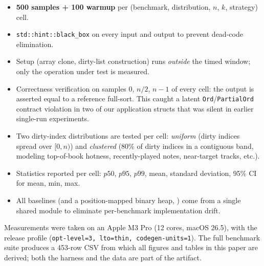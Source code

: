 \begin{itemize}
  \item \textbf{500 samples + 100 warmup} per
        (benchmark, distribution, $n$, $k$, strategy) cell.
  \item \texttt{std::hint::black\_box} on every input and output to
        prevent dead-code elimination.
  \item Setup (array clone, dirty-list construction) runs \emph{outside}
        the timed window; only the operation under test is measured.
  \item Correctness verification on samples $0$, $n/2$, $n-1$ of every cell:
        the output is asserted equal to a reference full-sort. This caught a
        latent \texttt{Ord}/\texttt{PartialOrd} contract violation in two of
        our application structs that was silent in earlier single-run
        experiments.
  \item Two dirty-index distributions are tested per cell: \emph{uniform}
        (dirty indices spread over $[0,n)$) and \emph{clustered} (80\% of
        dirty indices in a contiguous band, modeling top-of-book hotness,
        recently-played notes, near-target tracks, etc.).
  \item Statistics reported per cell: $p50$, $p95$, $p99$, mean, standard
        deviation, 95\% CI for mean, min, max.
  \item All baselines (\ESM and a position-mapped binary heap, \PosHeap)
        come from a single shared module to eliminate
        per-benchmark implementation drift.
\end{itemize}

Measurements were taken on an Apple M3 Pro (12 cores, macOS 26.5), with the
release profile (\texttt{opt-level=3, lto=thin, codegen-units=1}). The full
benchmark suite produces a 453-row CSV from which all figures and tables in
this paper are derived; both the harness and the data are part of the
artifact.
